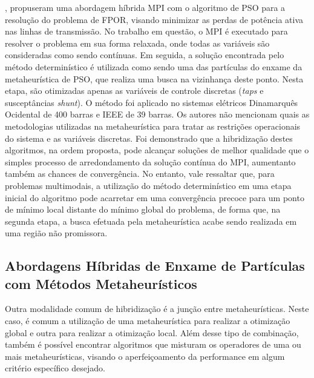 \documentclass[
	12pt,				%
	openany,			%
	twoside,			%
	a4paper,			%
	chapter=TITLE,		%
	section=Title,		%
	subsection=Title,	%
	subsubsection=Title,%
	english,			%
	french,				%
	spanish,			%
	brazil			%
	]{abntex2}
\begin{document}
\begin{ERRATA}
, propuseram uma abordagem híbrida MPI com o algoritmo de PSO para a resolução do problema de FPOR, visando minimizar as perdas de potência ativa nas linhas de transmissão. No trabalho em questão, o MPI é executado para resolver o problema em sua forma relaxada, onde todas as variáveis são consideradas como sendo contínuas. Em seguida, a solução encontrada pelo método determinístico é utilizada como sendo uma das partículas do enxame da metaheurística de PSO, que realiza uma busca na vizinhança deste ponto. Nesta etapa, são otimizadas apenas as variáveis de controle discretas (\emph{taps} e susceptâncias \emph{shunt}). O método foi aplicado no sistemas elétricos Dinamarquês Ocidental de 400 barras e IEEE de 39 barras. Os autores não mencionam quais as metodologias utilizadas na metaheurística para tratar as restrições operacionais do sistema e as variáveis discretas. Foi demonstrado que a hibridização destes algoritmos, na ordem proposta, pode alcançar soluções de melhor qualidade que o simples processo de arredondamento da solução contínua do MPI, aumentanto também as chances de convergência. No entanto, vale ressaltar que, para problemas multimodais, a utilização do método determinístico em uma etapa inicial do algoritmo pode acarretar em uma convergência precoce para um ponto de mínimo local distante do mínimo global do problema, de forma que, na segunda etapa, a busca
efetuada pela metaheurística acabe sendo realizada em uma região não promissora.


\subsection{Abordagens Híbridas de Enxame de Partículas com Métodos Metaheurísticos}

Outra modalidade comum de hibridização é a junção entre metaheurísticas. Neste caso, é comum a utilização de uma metaheurística para realizar a otimização global e outra para realizar a otimização local. Além desse tipo de combinação, também é possível encontrar algoritmos que misturam os operadores de uma ou mais metaheurísticas, visando o aperfeiçoamento da performance em algum critério específico desejado.


\end{ERRATA}
\end{document}
